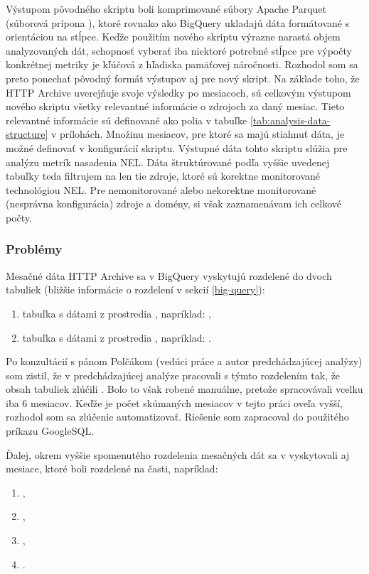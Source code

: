 Výstupom pôvodného skriptu boli komprimované súbory Apache Parquet (súborová prípona ), ktoré rovnako ako BigQuery ukladajú dáta formátované s orientáciou na stĺpce.
Keďže použitím nového skriptu výrazne narastá objem analyzovaných dát, schopnosť vyberať iba niektoré potrebné stĺpce pre výpočty konkrétnej metriky je kľúčová z hľadiska pamäťovej náročnosti.
Rozhodol som sa preto ponechať pôvodný formát výstupov aj pre nový skript. 
Na základe toho, že HTTP Archive uverejňuje svoje výsledky po mesiacoch, sú celkovým výstupom 
nového skriptu všetky relevantné informácie o zdrojoch za daný mesiac.
Tieto relevantné informácie sú definované ako polia v tabuľke \ref{tab:analysis-data-structure} v prílohách.
Množinu mesiacov, pre ktoré sa majú stiahnuť dáta, je možné definovať v konfigurácií skriptu.
Výstupné dáta tohto skriptu slúžia pre analýzu metrík nasadenia NEL.
Dáta štruktúrované podľa vyššie uvedenej tabuľky teda filtrujem na len tie zdroje, ktoré sú korektne monitorované technológiou NEL.
Pre nemonitorované alebo nekorektne monitorované (nesprávna konfigurácia) zdroje a domény, si však zaznamenávam ich celkové počty.

\subsubsection{Problémy}

Mesačné dáta HTTP Archive sa v BigQuery vyskytujú rozdelené do dvoch tabuliek (bližšie informácie o rozdelení v sekcií \ref{big-query}):
\begin{enumerate}
    \item tabuľka s dátami z prostredia , napríklad: ,
    \item tabuľka s dátami z prostredia , napríklad: .
\end{enumerate}

Po konzultácií s pánom Polčákom (vedúci práce a autor predchádzajúcej analýzy) som zistil, že v predchádzajúcej analýze pracovali s týmto rozdelením tak, že obsah tabuliek zlúčili \cite{nel-http-archive}.
Bolo to však robené manuálne, pretože spracovávali vcelku iba 6 mesiacov.
Keďže je počet skúmaných mesiacov v tejto práci oveľa vyšší, rozhodol som sa zlúčenie automatizovať.
Riešenie som zapracoval do použitého príkazu GoogleSQL.

Ďalej, okrem vyššie spomenutého rozdelenia mesačných dát sa v vyskytovali aj mesiace, ktoré boli rozdelené na časti, napríklad:
\begin{enumerate}
    \item {},
    \item {},
    \item {},
    \item {}.
\end{enumerate}


